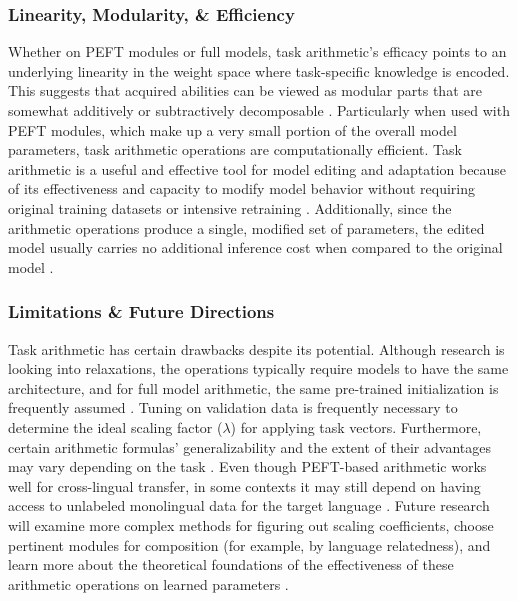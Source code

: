 \documentclass{DESSThesis}
\begin{document}
\subsubsection{Linearity, Modularity, \& Efficiency}
Whether on PEFT modules or full models, task arithmetic's efficacy points to an underlying linearity in the weight space where task-specific knowledge is encoded. This suggests that acquired abilities can be viewed as modular parts that are somewhat additively or subtractively decomposable \cite{ilharco_editing_2023,chronopoulou_language_2023}. Particularly when used with PEFT modules, which make up a very small portion of the overall model parameters, task arithmetic operations are computationally efficient. Task arithmetic is a useful and effective tool for model editing and adaptation because of its effectiveness and capacity to modify model behavior without requiring original training datasets or intensive retraining \cite{ilharco_editing_2023,chronopoulou_language_2023}. Additionally, since the arithmetic operations produce a single, modified set of parameters, the edited model usually carries no additional inference cost when compared to the original model \cite{ilharco_editing_2023,chronopoulou_language_2023}.

\subsubsection{Limitations \& Future Directions}
Task arithmetic has certain drawbacks despite its potential. Although research is looking into relaxations, the operations typically require models to have the same architecture, and for full model arithmetic, the same pre-trained initialization is frequently assumed \cite{ilharco_editing_2023}. Tuning on validation data is frequently necessary to determine the ideal scaling factor ($\lambda$) for applying task vectors. Furthermore, certain arithmetic formulas' generalizability and the extent of their advantages may vary depending on the task \cite{chronopoulou_language_2023}. Even though PEFT-based arithmetic works well for cross-lingual transfer, in some contexts it may still depend on having access to unlabeled monolingual data for the target language \cite{chronopoulou_language_2023}. Future research will examine more complex methods for figuring out scaling coefficients, choose pertinent modules for composition (for example, by language relatedness), and learn more about the theoretical foundations of the effectiveness of these arithmetic operations on learned parameters \cite{ilharco_editing_2023,chronopoulou_language_2023}.
\end{document}
